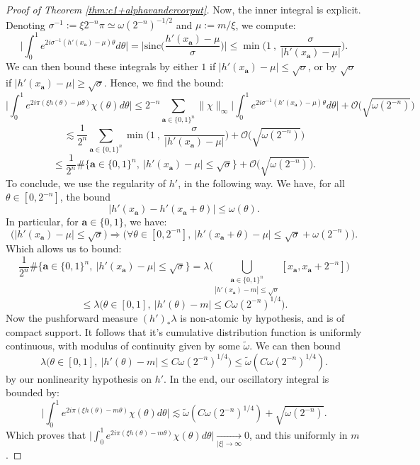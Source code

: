 \documentclass[11pt]{amsart}
\theoremstyle{plain}
\theoremstyle{definition}
\numberwithin{equation}{section}
\begin{document}
\begin{proof}[Proof of Theorem \ref{thm:c1+alphavandercorput}]
Now, the inner integral is explicit. Denoting $\sigma^{-1} := \xi 2^{-n} \pi \simeq \omega(2^{-n})^{-1/2}$ and $\mu := m/\xi$, we compute:
$$ \Big|\int_{0}^{1} e^{2 i \sigma^{-1} ( h'(x_\mathbf{a}) - \mu) \theta} d\theta \Big| = \Big|\text{sinc}\Big(\frac{h'(x_\mathbf{a})-\mu}{\sigma} \Big)\Big| \leq \min\Big( 1 \ , \ \frac{\sigma}{|h'(x_\mathbf{a})-\mu|}  \Big). $$
We can then bound these integrals by either $1$ if $|h'(x_\mathbf{a})-\mu| \leq \sqrt{\sigma}$, or by $\sqrt{\sigma}$ if $|h'(x_\mathbf{a})-\mu| \geq \sqrt{\sigma}$.
Hence, we find the bound:
$$ \Big|\int_{0}^1 e^{2 i \pi (\xi h(\theta) - \mu \theta)} \chi(\theta) d\theta \Big| \leq  2^{-n} \sum_{\mathbf{a} \in \{0,1\}^n} \|\chi\|_\infty \Big| \int_{0}^{1} e^{2i  \sigma^{-1} ( h'(x_\mathbf{a}) - \mu) \theta} d\theta \Big| + \mathcal{O}\big(\sqrt{\omega(2^{-n})}\big) $$
$$ \lesssim \frac{1}{2^n}  \sum_{\mathbf{a} \in \{0,1\}^n} \min\Big( 1 \ , \ \frac{\sigma}{|h'(x_\mathbf{a})-\mu|}  \Big) + \mathcal{O}\big(\sqrt{\omega(2^{-n})}\big) $$
$$ \leq \frac{1}{2^n} \# \{ \mathbf{a} \in \{0,1\}^n, \ |h'(x_\mathbf{a}) - \mu| \leq \sqrt{\sigma} \} +   \mathcal{O}\big(\sqrt{\omega(2^{-n})}\big) .$$
To conclude, we use the regularity of $h'$, in the following way. We have, for all $\theta \in [0, 2^{-n}]$, the bound 
$$ |h'(x_\mathbf{a}) - h'(x_\mathbf{a}+\theta)| \leq \omega(\theta). $$
In particular, for $\mathbf{a} \in \{0,1\}$, we have:
$$ \Big(|h'(x_\mathbf{a}) - \mu| \leq \sqrt{\sigma} \Big) \Rightarrow \Big( \forall \theta \in [0,2^{-n}], \ |h'(x_\mathbf{a}+\theta)-\mu| \leq \sqrt{\sigma} + \omega(2^{-n}) \Big). $$
Which allows us to bound:
$$ \frac{1}{2^n} \# \{ \mathbf{a} \in \{0,1\}^n, \ |h'(x_\mathbf{a}) - \mu| \leq \sqrt{\sigma} \} = \lambda\Big( \underset{|h'(x_\mathbf{a}) - m|  \leq \sqrt{\sigma}}{\bigcup_{\mathbf{a} \in \{0,1\}^n}} [x_\mathbf{a},x_\mathbf{a}+2^{-n}] \Big) $$
$$ \leq \lambda\Big( \theta \in [0,1], \ |h'(\theta)-m| \leq C \omega(2^{-n})^{1/4}  \Big). $$
Now the pushforward measure $(h')_* \lambda$ is non-atomic by hypothesis, and is of compact support. It follows that it's cumulative distribution function is uniformly continuous, with modulus of continuity given by some $\tilde{\omega}$. We can then bound
$$ \lambda\Big( \theta \in [0,1], \ |h'(\theta)-m| \leq C \omega(2^{-n})^{1/4}  \Big) \leq \tilde{\omega}(C \omega(2^{-n})^{1/4}). $$
by our nonlinearity hypothesis on $h'$.
In the end, our oscillatory integral is bounded by:
$$ \Big|\int_{0}^1 e^{2 i \pi (\xi h(\theta) - m \theta)} \chi(\theta) d\theta \Big| \lesssim \tilde{\omega}(C \omega(2^{-n})^{1/4}) + \sqrt{\omega(2^{-n})}.$$
Which proves that $\Big|\int_{0}^1 e^{2 i \pi (\xi h(\theta) - m \theta)} \chi(\theta) d\theta \Big| \underset{|\xi| \rightarrow \infty} \longrightarrow 0$, and this uniformly in $m$.
\end{proof}
\end{document}
